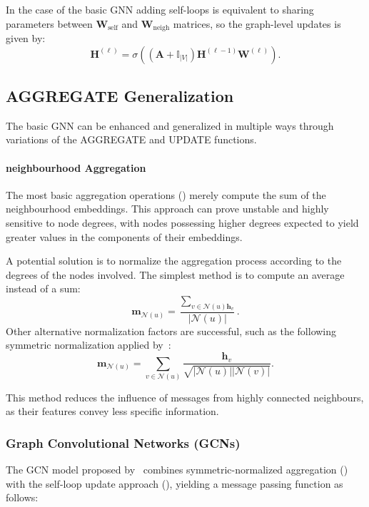 In the case of the basic GNN adding self-loops is equivalent to sharing parameters between $\mathbf{W}_\text{self}$ and $\mathbf{W}_\text{neigh}$ matrices, so the graph-level updates is given by:
\begin{equation}\label{eq:basicGNNgraphlevelselfLoop}
    \mathbf{H}^{(\ell)} = \sigma\left(\left(\mathbf{A} + \mathbb{I}_{|V|}\right)\mathbf{H}^{(\ell-1)}\mathbf{W}^{(\ell)}\right).
\end{equation}


\subsection{AGGREGATE Generalization}
The basic GNN can be enhanced and generalized in multiple ways through variations of the AGGREGATE and UPDATE functions.

\paragraph{neighbourhood Aggregation}
The most basic aggregation operations () merely compute the sum of the neighbourhood embeddings. This approach can prove unstable and highly sensitive to node degrees, with nodes possessing higher degrees expected to yield greater values in the components of their embeddings.

A potential solution is to normalize the aggregation process according to the degrees of the nodes involved. The simplest method is to compute an average instead of a sum:
\begin{equation*}
    \mathbf{m}_{\mathcal{N}(u)} = \frac{\sum_{v \in \mathcal{N}(u) \mathbf{h}_v}}{|\mathcal{N}(u)|}.
\end{equation*}
Other alternative normalization factors are successful, such as the following symmetric normalization applied by~\cite{kipf2016semi}:
\begin{equation}\label{eq:symmetricNormalization}
    \mathbf{m}_{\mathcal{N}(u)} = \sum_{v \in \mathcal{N}(u)}\frac{ \mathbf{h}_v}{\sqrt{|\mathcal{N}(u)||\mathcal{N}(v)|}}.
\end{equation}

This method reduces the influence of messages from highly connected neighbours, as their features convey less specific information.

\subsubsection{Graph Convolutional Networks (GCNs)}
The GCN model proposed by~\cite{kipf2016semi} combines symmetric-normalized aggregation () with the self-loop update approach (), yielding a message passing function as follows:

